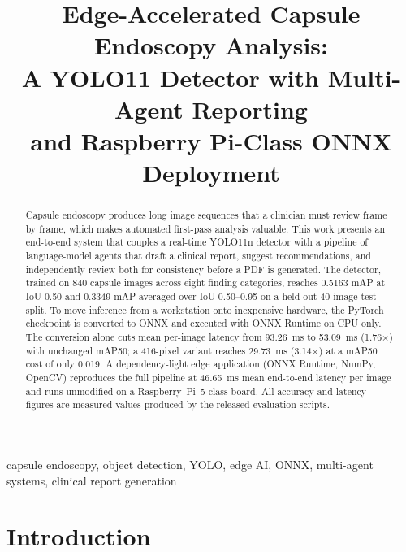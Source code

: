 \documentclass[conference]{IEEEtran}
\begin{document}
\title{Edge-Accelerated Capsule Endoscopy Analysis:\\
A YOLO11 Detector with Multi-Agent Reporting\\
and Raspberry Pi-Class ONNX Deployment}

\author{
}

\maketitle

\begin{abstract}
Capsule endoscopy produces long image sequences that a clinician must review
frame by frame, which makes automated first-pass analysis valuable. This work
presents an end-to-end system that couples a real-time YOLO11n detector with a
pipeline of language-model agents that draft a clinical report, suggest
recommendations, and independently review both for consistency before a PDF is
generated. The detector, trained on 840 capsule images across eight finding
categories, reaches 0.5163 mAP at IoU 0.50 and 0.3349 mAP averaged over
IoU 0.50--0.95 on a held-out 40-image test split. To move inference from a
workstation onto inexpensive hardware, the PyTorch checkpoint is converted to
ONNX and executed with ONNX Runtime on CPU only. The conversion alone cuts
mean per-image latency from 93.26~ms to 53.09~ms (1.76$\times$) with unchanged
mAP50; a 416-pixel variant reaches 29.73~ms (3.14$\times$) at a mAP50 cost of
only 0.019. A dependency-light edge application (ONNX Runtime, NumPy, OpenCV)
reproduces the full pipeline at 46.65~ms mean end-to-end latency per image and
runs unmodified on a Raspberry~Pi~5-class board. All accuracy and latency
figures are measured values produced by the released evaluation scripts.
\end{abstract}

\begin{IEEEkeywords}
capsule endoscopy, object detection, YOLO, edge AI, ONNX, multi-agent systems,
clinical report generation
\end{IEEEkeywords}

\section{Introduction}
\label{sec:intro}
\end{document}
